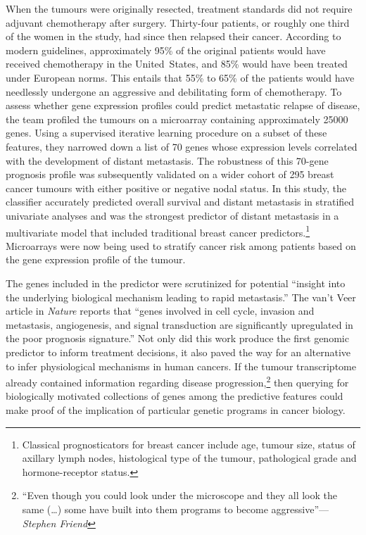 When the tumours were originally resected, treatment standards did not require
adjuvant chemotherapy after surgery.  Thirty-four patients, or roughly one third
of the women in the study, had since then relapsed their cancer.  According to
modern guidelines, approximately 95\% of the original patients would have
received chemotherapy in the \mbox{United States}, and 85\% would have been
treated under European norms.  This entails that 55\% to 65\% of the patients
would have needlessly undergone an aggressive and debilitating form of
chemotherapy.  To assess whether gene expression profiles could predict
metastatic relapse of disease, the  team profiled the tumours on
a microarray containing approximately \num{25000} genes.  Using a supervised
iterative learning procedure on a subset of these features, they narrowed down a
list of 70 genes whose expression levels correlated with the development of
distant metastasis.  The robustness of this \mbox{70-gene} prognosis profile was
subsequently validated on a wider cohort of 295 breast cancer tumours with
either positive or negative nodal
status.\cite{van_de_vijver_gene-expression_2002} In this study, the classifier
accurately predicted overall survival and distant metastasis in stratified
univariate analyses and was the strongest predictor of distant metastasis in a
multivariate model that included traditional breast cancer
predictors.\footnote{Classical prognosticators for breast cancer include age,
  tumour size, status of axillary lymph nodes, histological type of the tumour,
  pathological grade and \mbox{hormone-receptor} status.}  Microarrays were now
being used to stratify cancer risk among patients based on the gene expression
profile of the tumour.

The genes included in the predictor were scrutinized for potential ``insight
into the underlying biological mechanism leading to rapid metastasis.''  The
van't Veer article in \emph{Nature} reports that ``genes involved in cell cycle,
invasion and metastasis, angiogenesis, and signal transduction are significantly
upregulated in the poor prognosis signature.''  Not only did this work produce
the first genomic predictor to inform treatment decisions, it also paved the way
for an alternative to infer physiological mechanisms in human cancers.  If the
tumour transcriptome already contained information regarding disease
progression,\footnote{``Even though you could look under the microscope and they
  all look the same (\ldots{}) some have built into them programs to become
  aggressive''---\emph{Stephen Friend}} then querying for biologically motivated
collections of genes among the predictive features could make proof of the
implication of particular genetic programs in cancer biology.

